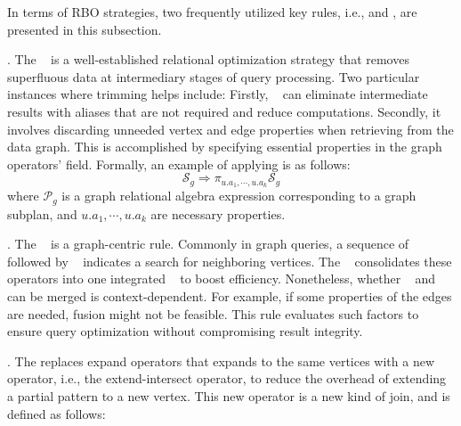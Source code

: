 In terms of RBO strategies, two frequently utilized key rules, i.e., \trimrule and \fusionrule, are presented in this subsection.

\trimrule. 
The \trimrule~ is a well-established relational optimization strategy that removes superfluous data at intermediary stages of query processing. 
Two particular instances where trimming helps include: 
Firstly, \trimrule~ can eliminate intermediate results with aliases that are not required and reduce computations.
Secondly, it involves discarding unneeded vertex and edge properties when retrieving from the data graph. 
This is accomplished by specifying essential properties in the graph operators’  field.
Formally, an example of applying \trimrule is as follows:
\begin{equation}
    \mathcal{S}_g \Rightarrow \pi_{u.a_1, \cdots, u.a_k}\mathcal{S} _g 
\end{equation}
where $\mathcal{P}_g$ is a graph relational algebra expression corresponding to a graph subplan, and $u.a_1, \cdots, u.a_k$ are necessary properties.


\fusionrule. 
The \fusionrule~ is a graph-centric rule. 
Commonly in graph queries, a sequence of \expandedge~ followed by \getvertex~ indicates a search for neighboring vertices. 
The \fusionrule~ consolidates these operators into one integrated \expandvertex~ to boost efficiency. 
Nonetheless, whether \expandedge~ and \getvertex~ can be merged is context-dependent. 
For example, if some properties of the edges are needed, fusion might not be feasible.
This rule evaluates such factors to ensure query optimization without compromising result integrity.


\expandintersectrule.
The \expandintersectrule replaces expand operators that expands to the same vertices with a new operator, i.e., the extend-intersect operator, to reduce the overhead of extending a partial pattern to a new vertex.
This new operator is a new kind of join, and is defined as follows:

